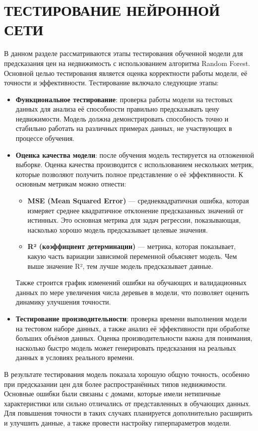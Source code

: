 {\section{\MakeUppercase{Тестирование нейронной сети}}
В данном разделе рассматриваются этапы тестирования обученной модели для предсказания цен на недвижимость с использованием алгоритма Random Forest. Основной целью тестирования является оценка корректности работы модели, её точности и эффективности. Тестирование включало следующие этапы:

\begin{itemize}
    \item \textbf{Функциональное тестирование}: проверка работы модели на тестовых данных для анализа её способности правильно предсказывать цену недвижимости. Модель должна демонстрировать способность точно и стабильно работать на различных примерах данных, не участвующих в процессе обучения.
    \item \textbf{Оценка качества модели}: после обучения модель тестируется на отложенной выборке. Оценка качества производится с использованием нескольких метрик, которые позволяют получить полное представление о её эффективности. К основным метрикам можно отнести:
    \begin{itemize} 
        \item \textbf{MSE (Mean Squared Error)} — среднеквадратичная ошибка, которая измеряет среднее квадратичное отклонение предсказанных значений от истинных. Это основная метрика для задач регрессии, показывающая, насколько хорошо модель предсказывает целевые значения.
        \item \textbf{R² (коэффициент детерминации)} — метрика, которая показывает, какую часть вариации зависимой переменной объясняет модель. Чем выше значение R², тем лучше модель предсказывает данные.
    \end{itemize}
    Также строится график изменений ошибки на обучающих и валидационных данных по мере увеличения числа деревьев в модели, что позволяет оценить динамику улучшения точности.
    \item \textbf{Тестирование производительности}: проверка времени выполнения модели на тестовом наборе данных, а также анализ её эффективности при обработке больших объёмов данных. Оценка производительности важна для понимания, насколько быстро модель может генерировать предсказания на реальных данных в условиях реального времени.
\end{itemize}

В результате тестирования модель показала хорошую общую точность, особенно при предсказании цен для более распространённых типов недвижимости. Основные ошибки были связаны с домами, которые имели нетипичные характеристики или сильно отличались от представленных в обучающих данных. Для повышения точности в таких случаях планируется дополнительно расширить и улучшить данные, а также провести настройку гиперпараметров модели.
\newpage
}
